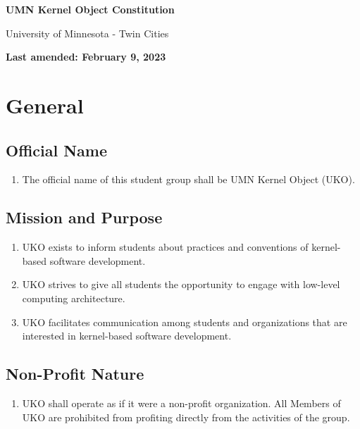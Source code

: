 \documentclass[12pt,executivepaper]{article}
\begin{document}
\begin{center}
    \Large
    \textbf{UMN Kernel Object Constitution}

    \smallskip

    \large
    University of Minnesota - Twin Cities

    \smallskip

    \normalsize
    \textbf{Last amended: February 9, 2023}
\end{center}

\section{General}

\subsection{Official Name}
\begin{enumerate}
    \item The official name of this student group shall be UMN Kernel Object
          (UKO).
\end{enumerate}

\subsection{Mission and Purpose}
\begin{enumerate}
    \item UKO exists to inform students about practices and conventions of
          kernel-based software development.
    \item UKO strives to give all students the opportunity to engage with
          low-level computing architecture.
    \item UKO facilitates communication among students and organizations that
          are interested in kernel-based software development.
\end{enumerate}

\subsection{Non-Profit Nature}
\begin{enumerate}
    \item UKO shall operate as if it were a non-profit organization. All
          Members of UKO are prohibited from profiting directly from the
          activities of the group.
\end{enumerate}
\end{document}
